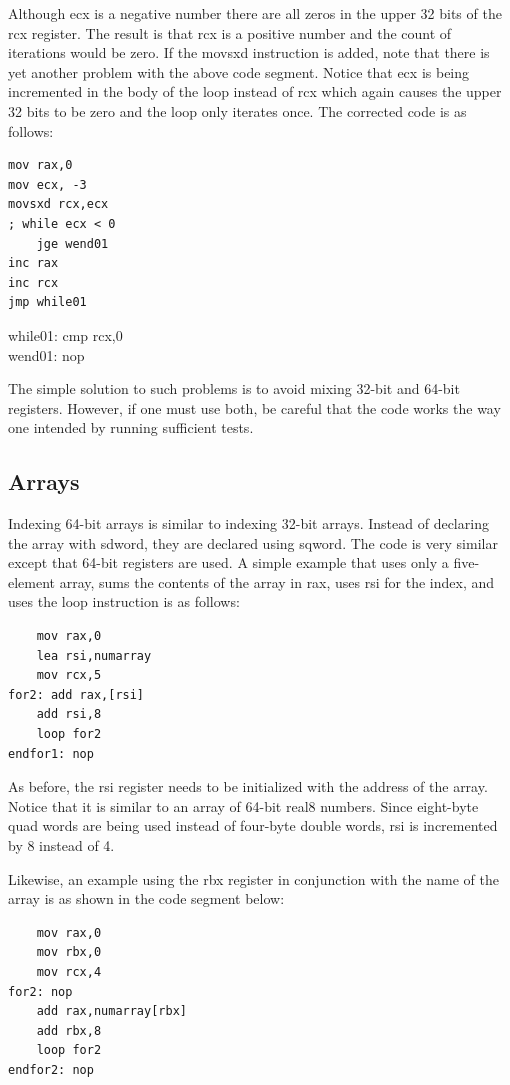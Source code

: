 \documentclass[10pt]{book}
\begin{document}
Although ecx is a negative number there are all zeros in the upper 32 bits of the rcx register. The result is that rcx is a positive number and the count of iterations would be zero. If the movsxd instruction is added, note that there is yet another problem with the above code segment. Notice that ecx is being incremented in the body of the loop instead of rcx which again causes the upper 32 bits to be zero and the loop only iterates once. The corrected code is as follows:

\begin{verbatim}
mov rax,0
mov ecx, -3
movsxd rcx,ecx
; while ecx < 0
    jge wend01
inc rax
inc rcx
jmp while01
\end{verbatim}

while01: cmp rcx,0\\
wend01: nop

The simple solution to such problems is to avoid mixing 32-bit and 64-bit registers. However, if one must use both, be careful that the code works the way one intended by running sufficient tests.

\subsection{Arrays}
Indexing 64-bit arrays is similar to indexing 32-bit arrays. Instead of declaring the array with sdword, they are declared using sqword. The code is very similar except that 64-bit registers are used. A simple example that uses only a five-element array, sums the contents of the array in rax, uses rsi for the index, and uses the loop instruction is as follows:


\begin{verbatim}
    mov rax,0
    lea rsi,numarray
    mov rcx,5
for2: add rax,[rsi]
    add rsi,8
    loop for2
endfor1: nop
\end{verbatim}

As before, the rsi register needs to be initialized with the address of the array. Notice that it is similar to an array of 64-bit real8 numbers. Since eight-byte quad words are being used instead of four-byte double words, rsi is incremented by 8 instead of 4.

Likewise, an example using the rbx register in conjunction with the name of the array is as shown in the code segment below:

\begin{verbatim}
    mov rax,0
    mov rbx,0
    mov rcx,4
for2: nop
    add rax,numarray[rbx]
    add rbx,8
    loop for2
endfor2: nop
\end{verbatim}
\end{document}
